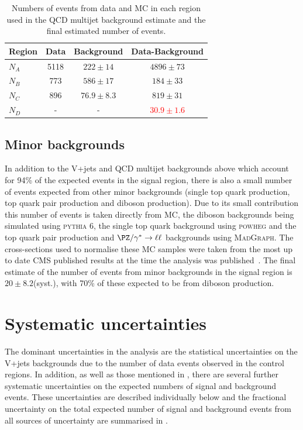 \begin{table}
  \caption{Numbers of events from data and \ac{MC} in each region used in the \ac{QCD} multijet background estimate and the final estimated number of events.}
  \label{tab:promptqcd}
  \begin{tabular}{lccc}
    \hline
    \hline
    Region & Data & Background & Data-Background \\
    \hline
    \hline
    $N_{A}$ & 5118 & $222\pm 14$ & $4896\pm 73$\\
    $N_{B}$ & 773  & $586\pm 17$ & $184 \pm 33$\\
    $N_{C}$ & 896  & $76.9\pm 8.3$ & $819\pm 31$\\
    \hline
    $N_{D}$ & - & - & \textcolor{red}{$30.9\pm 1.6$}\\
    \hline
    \hline
  \end{tabular}
\end{table}

\subsection{Minor backgrounds}
\label{sec:promptminor}
In addition to the V+jets and QCD multijet backgrounds above which account for 94\% of the expected events in the signal region, there is also a small number of events expected from other minor backgrounds (single top quark production, top quark pair production and diboson production). Due to its small contribution this number of events is taken directly from \ac{MC}, the diboson backgrounds being simulated using \textsc{pythia 6}, the single top quark background using \textsc{powheg} and the top quark pair production and $\PZ/\gamma^{*}\rightarrow\ell\ell$ backgrounds using \textsc{MadGraph}. The cross-sections used to normalise these \ac{MC} samples were taken from the most up to date CMS published results at the time the analysis was published~\cite{CMS:2012fza,CMS:2012iza,CMS:2012zva,CMS:2013qea,CMS:2013hea}. The final estimate of the number of events from minor backgrounds in the signal region is $20\pm 8.2$(syst.), with 70\% of these expected to be from diboson production.


\section{Systematic uncertainties}
\label{sec:promptsyst}
The dominant uncertainties in the analysis are the statistical uncertainties on the V+jets backgrounds due to the number of data events observed in the control regions. In addition, as well as those mentioned in , there are several further systematic uncertainties on the expected numbers of signal and background events. These uncertainties are described individually below and the fractional uncertainty on the total expected number of signal and background events from all sources of uncertainty are summarised in .
